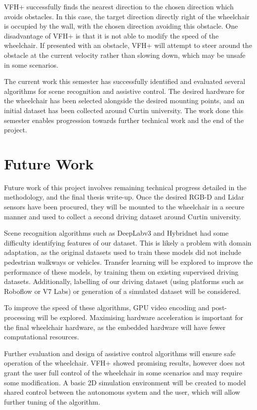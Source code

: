 \documentclass[12pt]{article}
\begin{document}
VFH+ successfully finds the nearest direction to the chosen direction which avoids obstacles.
In this case, the target direction directly right of the wheelchair is
occupied by the wall, with the chosen direction avoiding this obstacle.
One disadvantage of VFH+ is that it is not able to modify the speed of the wheelchair.
If presented with an obstacle, VFH+ will attempt to steer around the obstacle at the current velocity rather than
slowing down, which may be unsafe in some scenarios.

The current work this semester has successfully identified and evaluated several algorithms for scene recognition and assistive control.
The desired hardware for the wheelchair has been selected alongside the desired mounting points, and an initial dataset has
been collected around Curtin university.
The work done this semester enables progression towards further technical work and the end of the project.

\pagebreak





\section{Future Work}
Future work of this project involves remaining technical progress detailed in the methodology,
and the final thesis write-up.
Once the desired RGB-D and Lidar sensors have been procured, they will be mounted to the wheelchair
in a secure manner and used to collect a second driving dataset around Curtin university.

Scene recognition algorithms such as DeepLabv3 and Hybridnet
had some difficulty identifying features of our dataset. This is likely a problem with domain adaptation,
as the original datasets used to train these models did not include pedestrian walkways or vehicles.
Transfer learning will be explored to improve the performance of these
models, by training them on existing supervised driving datasets.
Additionally, labelling of our driving dataset (using platforms such as Roboflow or V7 Labs)
or generation of a simulated dataset will be considered.

To improve the speed of these algorithms, GPU video encoding and post-processing will be explored.
Maximising hardware acceleration is important for the final wheelchair hardware, as the embedded hardware will have fewer
computational resources.

Further evaluation and design of assistive control algorithms will ensure safe operation of the wheelchair.
VFH+ showed promising results, however does not grant the user full control of the wheelchair
in some scenarios and may require some modification. A basic 2D simulation environment will be created
to model shared control between the autonomous system and the user, which will allow further tuning
of the algorithm.
\end{document}
